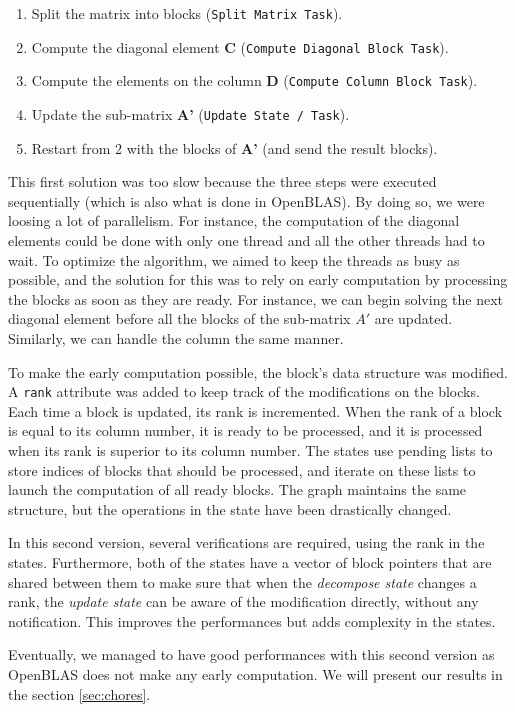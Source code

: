 \begin{enumerate}
  \item Split the matrix into blocks (\texttt{Split Matrix Task}).
  \item Compute the diagonal element \textbf{C} (\texttt{Compute Diagonal Block Task}).
  \item Compute the elements on the column \textbf{D} (\texttt{Compute Column Block Task}).
  \item Update the sub-matrix \textbf{A'} (\texttt{Update State / Task}).
  \item Restart from 2 with the blocks of \textbf{A'} (and send the result
    blocks).
\end{enumerate}

This first solution was too slow because the three steps were executed
sequentially (which is also what is done in OpenBLAS). By doing so, we were
loosing a lot of parallelism. For instance, the computation of the diagonal
elements could be done with only one thread and all the other threads had to
wait. To optimize the algorithm, we aimed to keep the threads as busy as
possible, and the solution for this was to rely on early computation by
processing the blocks as soon as they are ready. For instance, we can begin
solving the next diagonal element before all the blocks of the sub-matrix $A'$
are updated. Similarly, we can handle the column the same manner.

To make the early computation possible, the block's data structure was modified.
A \texttt{rank} attribute was added to keep track of the modifications on
the blocks. Each time a block is updated, its rank is incremented. When the rank
of a block is equal to its column number, it is ready to be processed, and it is
processed when its rank is superior to its column number. The states use pending
lists to store indices of blocks that should be processed, and iterate on these
lists to launch the computation of all ready blocks. The graph maintains the
same structure, but the operations in the state have been drastically changed.

In this second version, several verifications are required, using the rank
in the states. Furthermore, both of the states have a vector of block pointers
that are shared between them to make sure that when the \textit{decompose state}
changes a rank, the \textit{update state} can be aware of the modification
directly, without any notification. This improves the performances but adds
complexity in the states.

Eventually, we managed to have good performances with this second version as
OpenBLAS does not make any early computation. We will present our results in the
section \ref{sec:chores}.

